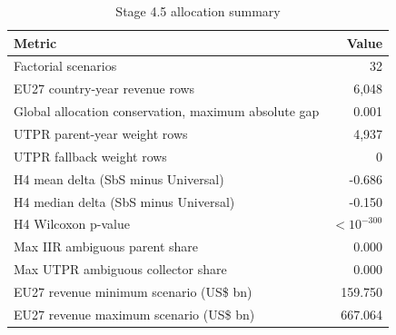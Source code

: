 \begin{table}[H]
\centering
\footnotesize
\setlength{\tabcolsep}{3pt}
\caption{Stage 4.5 allocation summary}
\label{tab:app_stage45_summary}
\begin{tabular}{@{}lr@{}}
\toprule
Metric & Value \\
\midrule
Factorial scenarios &              32 \\
EU27 country-year revenue rows &           6,048 \\
Global allocation conservation, maximum absolute gap &               0.001 \\
UTPR parent-year weight rows &           4,937 \\
UTPR fallback weight rows &               0 \\
H4 mean delta (SbS minus Universal) &  -0.686 \\
H4 median delta (SbS minus Universal) &  -0.150 \\
H4 Wilcoxon p-value & $< 10^{-300}$ \\
Max IIR ambiguous parent share &               0.000 \\
Max UTPR ambiguous collector share &               0.000 \\
EU27 revenue minimum scenario (US\$ bn) & 159.750 \\
EU27 revenue maximum scenario (US\$ bn) & 667.064 \\
\bottomrule
\end{tabular}
\end{table}
